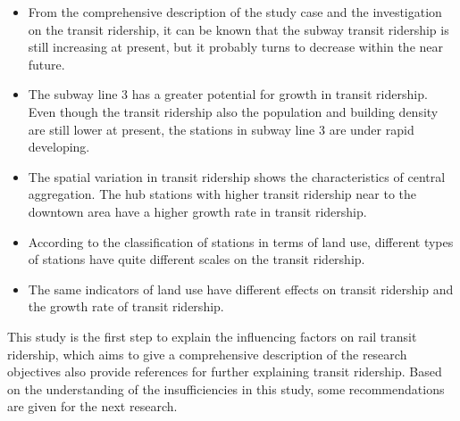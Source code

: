 %
\begin{itemize}
	\item From the comprehensive description of the study case and the investigation on the transit ridership, it can be known that the subway transit ridership is still increasing at present, but it probably turns to decrease within the near future. 
	
	\item The subway line 3 has a greater potential for growth in transit ridership. Even though the transit ridership also the population and building density are still lower at present, the stations in subway line 3 are under rapid developing.
	
	\item The spatial variation in transit ridership shows the characteristics of central aggregation. The hub stations with higher transit ridership near to the downtown area have a higher growth rate in transit ridership.
	
	\item According to the classification of stations in terms of land use, different types of stations have quite different scales on the transit ridership.
	
	\item The same indicators of land use have different effects on transit ridership and the growth rate of transit ridership.
\end{itemize}

%
This study is the first step to explain the influencing factors on rail transit ridership, which aims to give a comprehensive description of the research objectives also provide references for further explaining transit ridership. Based on the understanding of the insufficiencies in this study, some recommendations are given for the next research.

